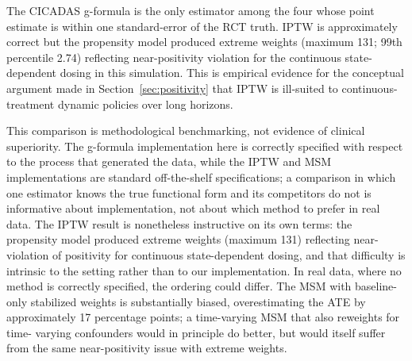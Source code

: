 The CICADAS g-formula is the only estimator among the four whose point estimate is within
one standard-error of the RCT truth. IPTW is approximately correct but the propensity
model produced extreme weights (maximum 131; 99th percentile 2.74) reflecting
near-positivity violation for the continuous state-dependent dosing in this simulation.
This is empirical evidence for the conceptual argument made in Section~\ref{sec:positivity} that IPTW is
ill-suited to continuous-treatment dynamic policies over long horizons.

This comparison is methodological benchmarking, not evidence of clinical superiority. The g-formula
implementation here is correctly specified with respect to the process that generated the data, while
the IPTW and MSM implementations are standard off-the-shelf specifications; a comparison in which one
estimator knows the true functional form and its competitors do not is informative about
implementation, not about which method to prefer in real data. The IPTW result is nonetheless
instructive on its own terms: the propensity model produced extreme weights (maximum 131) reflecting
near-violation of positivity for continuous state-dependent dosing, and that difficulty is intrinsic
to the setting rather than to our implementation. In real data, where no method is correctly
specified, the ordering could differ. The MSM with
baseline-only stabilized weights is substantially biased, overestimating the ATE by
approximately 17 percentage points; a time-varying MSM that also reweights for time-
varying confounders would in principle do better, but would itself suffer from the same
near-positivity issue with extreme weights.
